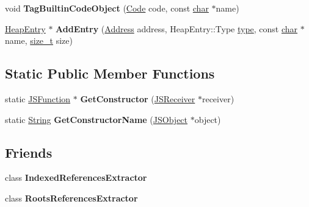 \begin{DoxyCompactItemize}
void {\bfseries Tag\+Builtin\+Code\+Object} (\mbox{\hyperlink{classv8_1_1internal_1_1Code}{Code}} code, const \mbox{\hyperlink{classchar}{char}} $\ast$name)
\item 
\mbox{\label{classv8_1_1internal_1_1V8HeapExplorer_abd278633cdd9c46c73e0455558f16068}} 
\mbox{\hyperlink{classv8_1_1internal_1_1HeapEntry}{Heap\+Entry}} $\ast$ {\bfseries Add\+Entry} (\mbox{\hyperlink{classuintptr__t}{Address}} address, Heap\+Entry\+::\+Type \mbox{\hyperlink{classstd_1_1conditional_1_1type}{type}}, const \mbox{\hyperlink{classchar}{char}} $\ast$name, \mbox{\hyperlink{classsize__t}{size\+\_\+t}} size)
\end{DoxyCompactItemize}
\subsection*{Static Public Member Functions}
\begin{DoxyCompactItemize}
\item 
\mbox{\label{classv8_1_1internal_1_1V8HeapExplorer_a651144b1fdda09da9a071bcf63665ba0}} 
static \mbox{\hyperlink{classv8_1_1internal_1_1JSFunction}{J\+S\+Function}} $\ast$ {\bfseries Get\+Constructor} (\mbox{\hyperlink{classv8_1_1internal_1_1JSReceiver}{J\+S\+Receiver}} $\ast$receiver)
\item 
\mbox{\label{classv8_1_1internal_1_1V8HeapExplorer_a3bd447f1a99a47187086943d637d35b5}} 
static \mbox{\hyperlink{classv8_1_1internal_1_1String}{String}} {\bfseries Get\+Constructor\+Name} (\mbox{\hyperlink{classv8_1_1internal_1_1JSObject}{J\+S\+Object}} $\ast$object)
\end{DoxyCompactItemize}
\subsection*{Friends}
\begin{DoxyCompactItemize}
\item 
\mbox{\label{classv8_1_1internal_1_1V8HeapExplorer_a6ef0d133911e40c06746778027023e0a}} 
class {\bfseries Indexed\+References\+Extractor}
\item 
\mbox{\label{classv8_1_1internal_1_1V8HeapExplorer_a07c650327bd63061c049a9ae184a0ba6}} 
class {\bfseries Roots\+References\+Extractor}
\end{DoxyCompactItemize}


